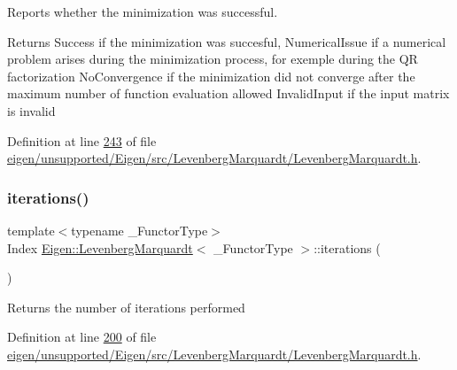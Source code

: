 Reports whether the minimization was successful. 

\begin{DoxyReturn}{Returns}
{\ttfamily Success} if the minimization was succesful, {\ttfamily Numerical\+Issue} if a numerical problem arises during the minimization process, for exemple during the QR factorization {\ttfamily No\+Convergence} if the minimization did not converge after the maximum number of function evaluation allowed {\ttfamily Invalid\+Input} if the input matrix is invalid 
\end{DoxyReturn}


Definition at line \hyperlink{eigen_2unsupported_2_eigen_2src_2_levenberg_marquardt_2_levenberg_marquardt_8h_source_l00243}{243} of file \hyperlink{eigen_2unsupported_2_eigen_2src_2_levenberg_marquardt_2_levenberg_marquardt_8h_source}{eigen/unsupported/\+Eigen/src/\+Levenberg\+Marquardt/\+Levenberg\+Marquardt.\+h}.

\mbox{\label{class_eigen_1_1_levenberg_marquardt_aeb094683f0abe9c29ee89be0677de744}} 
\subsubsection{\texorpdfstring{iterations()}{iterations()}\hspace{0.1cm}{\footnotesize\ttfamily [1/2]}}
{\footnotesize\ttfamily template$<$typename \+\_\+\+Functor\+Type$>$ \\
Index \hyperlink{class_eigen_1_1_levenberg_marquardt}{Eigen\+::\+Levenberg\+Marquardt}$<$ \+\_\+\+Functor\+Type $>$\+::iterations (\begin{DoxyParamCaption}{ }\end{DoxyParamCaption})\hspace{0.3cm}{\ttfamily [inline]}}

\begin{DoxyReturn}{Returns}
the number of iterations performed 
\end{DoxyReturn}


Definition at line \hyperlink{eigen_2unsupported_2_eigen_2src_2_levenberg_marquardt_2_levenberg_marquardt_8h_source_l00200}{200} of file \hyperlink{eigen_2unsupported_2_eigen_2src_2_levenberg_marquardt_2_levenberg_marquardt_8h_source}{eigen/unsupported/\+Eigen/src/\+Levenberg\+Marquardt/\+Levenberg\+Marquardt.\+h}.


